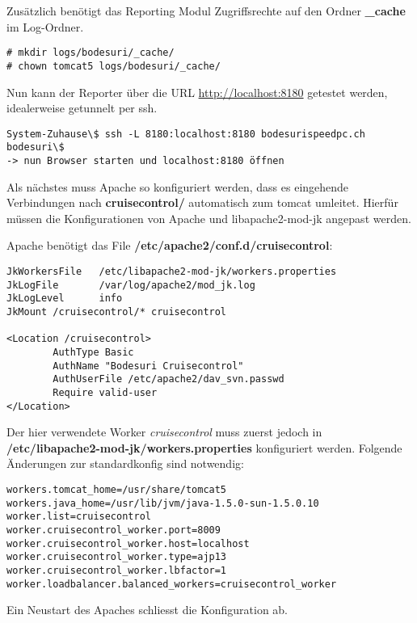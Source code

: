 \documentclass[a4paper,12pt,halfparskip,DIV14]{scrreprt}
\begin{document}
Zusätzlich benötigt das Reporting Modul Zugriffsrechte auf den Ordner \textbf{\_cache} im Log-Ordner.

\begin{verbatim}
# mkdir logs/bodesuri/_cache/
# chown tomcat5 logs/bodesuri/_cache/
\end{verbatim}

Nun kann der Reporter über die URL \url{http://localhost:8180} getestet werden, idealerweise getunnelt per ssh.

\begin{verbatim}
System-Zuhause\$ ssh -L 8180:localhost:8180 bodesurispeedpc.ch
bodesuri\$
-> nun Browser starten und localhost:8180 öffnen
\end{verbatim}

Als nächstes muss Apache so konfiguriert werden, dass es eingehende Verbindungen nach \textbf{cruisecontrol/} automatisch zum tomcat umleitet. Hierfür müssen die Konfigurationen von Apache und libapache2-mod-jk angepast werden.

Apache benötigt das File \textbf{/etc/apache2/conf.d/cruisecontrol}:

\begin{verbatim}
JkWorkersFile   /etc/libapache2-mod-jk/workers.properties
JkLogFile       /var/log/apache2/mod_jk.log
JkLogLevel      info
JkMount /cruisecontrol/* cruisecontrol

<Location /cruisecontrol>
        AuthType Basic
        AuthName "Bodesuri Cruisecontrol"
        AuthUserFile /etc/apache2/dav_svn.passwd
        Require valid-user
</Location>
\end{verbatim}

Der hier verwendete Worker \emph{cruisecontrol} muss zuerst jedoch in \textbf{ /etc/libapache2-mod-jk/workers.properties} konfiguriert werden. Folgende Änderungen zur standardkonfig sind notwendig:

\begin{verbatim}
workers.tomcat_home=/usr/share/tomcat5
workers.java_home=/usr/lib/jvm/java-1.5.0-sun-1.5.0.10
worker.list=cruisecontrol
worker.cruisecontrol_worker.port=8009
worker.cruisecontrol_worker.host=localhost
worker.cruisecontrol_worker.type=ajp13
worker.cruisecontrol_worker.lbfactor=1
worker.loadbalancer.balanced_workers=cruisecontrol_worker
\end{verbatim}

Ein Neustart des Apaches schliesst die Konfiguration ab.

\end{document}
